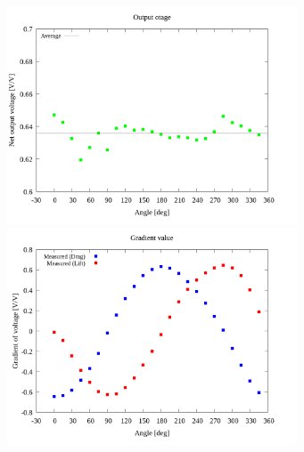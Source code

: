 \documentclass[twocolumn,a4j]{jsarticle}
\begin{document}
\begin{figure}[htbp]
    \footnotesize
    \begin{center}
        \includegraphics[width=86mm]{../graphes/1-1/05/05_summary-outputvoltage.png}
        \caption{}
        \includegraphics[width=86mm]{../graphes/1-1/05/05_summary-wave.png}
        \caption{}
    \end{center}
\end{figure}

\newpage
\end{document}
